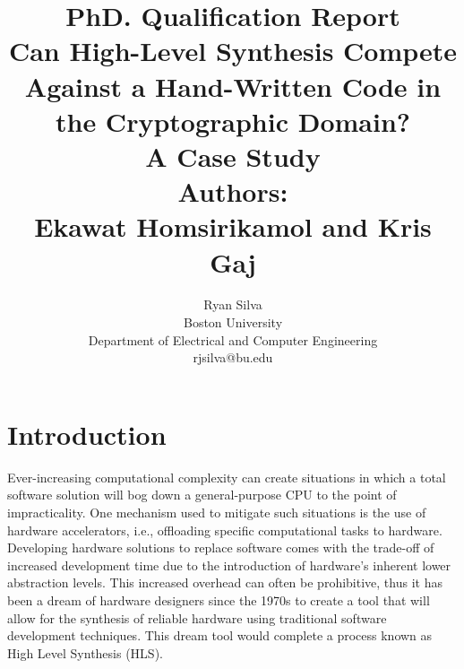 \documentclass[11pt,journal,compsoc, onecolumn]{IEEEtran}
\begin{document}
\title{PhD. Qualification Report \\ \LARGE{\textbf{Can High-Level Synthesis Compete Against a Hand-Written Code in the Cryptographic Domain? \\ A Case Study \cite{sel}}} \\ Authors: \\ Ekawat Homsirikamol and Kris Gaj}

\author{Ryan Silva \\ Boston University \\ Department of Electrical and Computer Engineering \\ rjsilva@bu.edu
}


\maketitle


\IEEEdisplaynontitleabstractindextext
\IEEEpeerreviewmaketitle

\section{Introduction}
Ever-increasing computational complexity can create situations in which a total software solution will bog down a general-purpose CPU to the point of impracticality. One mechanism used to mitigate such situations is the use of hardware accelerators, i.e., offloading specific computational tasks to hardware. Developing hardware solutions to replace software comes with the trade-off of increased development time due to the introduction of hardware's inherent lower abstraction levels. This increased overhead can often be prohibitive, thus it has been a dream of hardware designers since the 1970s to create a tool that will allow for the synthesis of reliable hardware using traditional software development techniques\cite{1}. This dream tool would complete a process known as High Level Synthesis (HLS).
\end{document}
